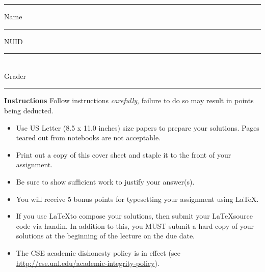 \documentclass[10pt]{exam}
\begin{document}
\hrule

\vspace{.50cm} Name \rule{2in}{.001in} \hfill NUID
\vspace{.50cm} \rule{2in}{.001in} \hfill 
\\ Grader \rule{2in}{.001in}

\textbf{Instructions} Follow instructions \emph{carefully}, failure to do so may result in points being deducted.  
\begin{itemize}

  \item Use US Letter (8.5 x 11.0 inches) size papers to prepare your solutions. Pages teared out from notebooks are not acceptable.
  \item Print out a copy of this cover sheet and staple it to the front of your assignment.  
  \item Be sure to show sufficient work to justify your answer(s).
  \item You will receive 5 bonus points for typesetting your assignment using \LaTeX.  
  \item If you use \LaTeX to compose your solutions, then submit your \LaTeX source code via handin. In addition to this, you MUST submit a hard copy of your solutions at the beginning of the lecture on the due date.
  \item The CSE academic dishonesty policy is in effect (see \url{http://cse.unl.edu/academic-integrity-policy}).   

\end{itemize}




\begin{center}
{\small \gradetable[v] }
\end{center}
\end{document}
